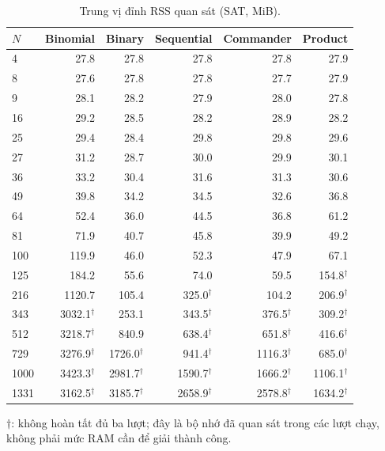 \begin{table}[pos=H]
\centering
\small
\caption{Trung vị đỉnh RSS quan sát (SAT, MiB).}
\label{tab:sat_ram}
\setlength{\tabcolsep}{4pt}
\begin{tabular}{@{}lrrrrr@{}}
\toprule
$N$ & Binomial & Binary & Sequential & Commander & Product \\
\midrule
4 & 27.8 & 27.8 & 27.8 & 27.8 & 27.9 \\
8 & 27.6 & 27.8 & 27.8 & 27.7 & 27.9 \\
9 & 28.1 & 28.2 & 27.9 & 28.0 & 27.8 \\
16 & 29.2 & 28.5 & 28.2 & 28.9 & 28.2 \\
25 & 29.4 & 28.4 & 29.8 & 29.8 & 29.6 \\
27 & 31.2 & 28.7 & 30.0 & 29.9 & 30.1 \\
36 & 33.2 & 30.4 & 31.6 & 31.3 & 30.6 \\
49 & 39.8 & 34.2 & 34.5 & 32.6 & 36.8 \\
64 & 52.4 & 36.0 & 44.5 & 36.8 & 61.2 \\
81 & 71.9 & 40.7 & 45.8 & 39.9 & 49.2 \\
100 & 119.9 & 46.0 & 52.3 & 47.9 & 67.1 \\
125 & 184.2 & 55.6 & 74.0 & 59.5 & 154.8$^{\dagger}$ \\
216 & 1120.7 & 105.4 & 325.0$^{\dagger}$ & 104.2 & 206.9$^{\dagger}$ \\
343 & 3032.1$^{\dagger}$ & 253.1 & 343.5$^{\dagger}$ & 376.5$^{\dagger}$ & 309.2$^{\dagger}$ \\
512 & 3218.7$^{\dagger}$ & 840.9 & 638.4$^{\dagger}$ & 651.8$^{\dagger}$ & 416.6$^{\dagger}$ \\
729 & 3276.9$^{\dagger}$ & 1726.0$^{\dagger}$ & 941.4$^{\dagger}$ & 1116.3$^{\dagger}$ & 685.0$^{\dagger}$ \\
1000 & 3423.3$^{\dagger}$ & 2981.7$^{\dagger}$ & 1590.7$^{\dagger}$ & 1666.2$^{\dagger}$ & 1106.1$^{\dagger}$ \\
1331 & 3162.5$^{\dagger}$ & 3185.7$^{\dagger}$ & 2658.9$^{\dagger}$ & 2578.8$^{\dagger}$ & 1634.2$^{\dagger}$ \\
\bottomrule
\end{tabular}
\par\smallskip\begin{minipage}{\linewidth}\footnotesize $\dagger$: không hoàn tất đủ ba lượt; đây là bộ nhớ đã quan sát trong các lượt chạy, không phải mức RAM cần để giải thành công.\end{minipage}
\end{table}
